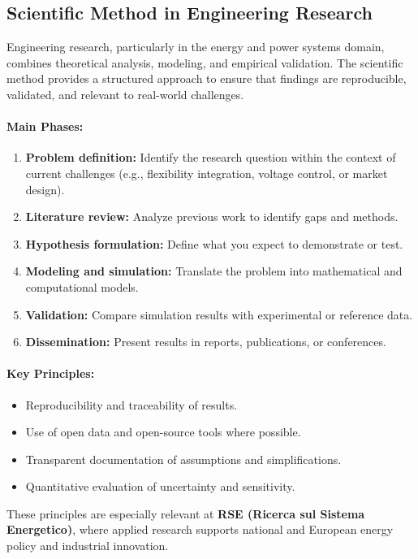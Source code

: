 \documentclass[11pt]{article}
\begin{document}
	\subsection{Scientific Method in Engineering Research}
	
	Engineering research, particularly in the energy and power systems domain, combines theoretical analysis, modeling, and empirical validation.  
	The scientific method provides a structured approach to ensure that findings are reproducible, validated, and relevant to real-world challenges.
	
	\paragraph{Main Phases:}
	\begin{enumerate}
		\item \textbf{Problem definition:} Identify the research question within the context of current challenges (e.g., flexibility integration, voltage control, or market design).
		\item \textbf{Literature review:} Analyze previous work to identify gaps and methods.
		\item \textbf{Hypothesis formulation:} Define what you expect to demonstrate or test.
		\item \textbf{Modeling and simulation:} Translate the problem into mathematical and computational models.
		\item \textbf{Validation:} Compare simulation results with experimental or reference data.
		\item \textbf{Dissemination:} Present results in reports, publications, or conferences.
	\end{enumerate}
	
	\paragraph{Key Principles:}
	\begin{itemize}
		\item Reproducibility and traceability of results.
		\item Use of open data and open-source tools where possible.
		\item Transparent documentation of assumptions and simplifications.
		\item Quantitative evaluation of uncertainty and sensitivity.
	\end{itemize}
	
	These principles are especially relevant at \textbf{RSE (Ricerca sul Sistema Energetico)}, where applied research supports national and European energy policy and industrial innovation.
	
\end{document}
